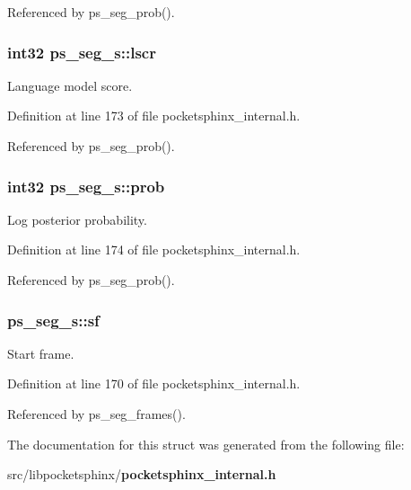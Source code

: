 Referenced by ps\-\_\-seg\-\_\-prob().

\subsubsection[{lscr}]{\setlength{\rightskip}{0pt plus 5cm}int32 ps\-\_\-seg\-\_\-s\-::lscr}\label{structps__seg__s_a69e605f422eeed1a9c67437e8ddd8b08}


Language model score. 



Definition at line 173 of file pocketsphinx\-\_\-internal.\-h.



Referenced by ps\-\_\-seg\-\_\-prob().

\subsubsection[{prob}]{\setlength{\rightskip}{0pt plus 5cm}int32 ps\-\_\-seg\-\_\-s\-::prob}\label{structps__seg__s_ae683244d90d0a5339930b47757778432}


Log posterior probability. 



Definition at line 174 of file pocketsphinx\-\_\-internal.\-h.



Referenced by ps\-\_\-seg\-\_\-prob().

\subsubsection[{sf}]{ ps\-\_\-seg\-\_\-s\-::sf}\label{structps__seg__s_a885a599726cd0efba573d106d016e6e2}


Start frame. 



Definition at line 170 of file pocketsphinx\-\_\-internal.\-h.



Referenced by ps\-\_\-seg\-\_\-frames().



The documentation for this struct was generated from the following file\-:\begin{DoxyCompactItemize}
\item 
src/libpocketsphinx/{\bf pocketsphinx\-\_\-internal.\-h}\end{DoxyCompactItemize}
